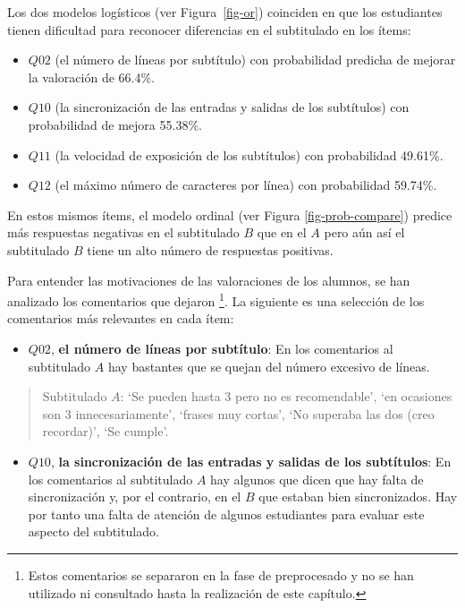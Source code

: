 \documentclass[
  12pt,
  a4paper,
  extrafontsizes,
  onecolumn,
  openright,
  table]{memoir}
\providecommand{\tightlist}{%
  \setlength{\itemsep}{0pt}\setlength{\parskip}{0pt}}\usepackage{longtable,booktabs,array}
\begin{document}
Los dos modelos logísticos (ver Figura~\ref{fig-or}) coinciden en que
los estudiantes tienen dificultad para reconocer diferencias en el
subtitulado en los ítems:

\begin{itemize}
\tightlist
\item
  \(Q02\) (el número de líneas por subtítulo) con probabilidad predicha
  de mejorar la valoración de 66.4\%.
\item
  \(Q10\) (la sincronización de las entradas y salidas de los
  subtítulos) con probabilidad de mejora 55.38\%.
\item
  \(Q11\) (la velocidad de exposición de los subtítulos) con
  probabilidad 49.61\%.
\item
  \(Q12\) (el máximo número de caracteres por línea) con probabilidad
  59.74\%.
\end{itemize}

En estos mismos ítems, el modelo ordinal (ver Figura
\ref{fig-prob-compare}) predice más respuestas negativas en el
subtitulado \(B\) que en el \(A\) pero aún así el subtitulado \(B\)
tiene un alto número de respuestas positivas.

Para entender las motivaciones de las valoraciones de los alumnos, se
han analizado los comentarios que dejaron \footnote{Estos comentarios se
  separaron en la fase de preprocesado y no se han utilizado ni
  consultado hasta la realización de este capítulo.}. La siguiente es
una selección de los comentarios más relevantes en cada ítem:

\begin{itemize}
\tightlist
\item
  \(Q02\), \textbf{el número de líneas por subtítulo}: En los
  comentarios al subtitulado \(A\) hay bastantes que se quejan del
  número excesivo de líneas.
\end{itemize}

\small

\begin{quote}
Subtitulado \(A\): \enquote*{Se pueden hasta 3 pero no es recomendable},
\enquote*{en ocasiones son 3 innecesariamente}, \enquote*{frases muy
cortas}, \enquote*{No superaba las dos (creo recordar)}, \enquote*{Se
cumple}.
\end{quote}

\normalsize

\begin{itemize}
\tightlist
\item
  \(Q10\), \textbf{la sincronización de las entradas y salidas de los
  subtítulos}: En los comentarios al subtitulado \(A\) hay algunos que
  dicen que hay falta de sincronización y, por el contrario, en el \(B\)
  que estaban bien sincronizados. Hay por tanto una falta de atención de
  algunos estudiantes para evaluar este aspecto del subtitulado.
\end{itemize}
\end{document}
